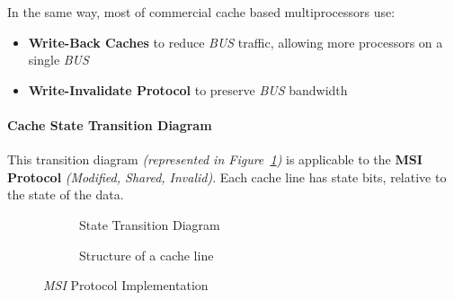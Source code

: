 \documentclass[english]{article}
\begin{document}
In the same way, most of commercial cache based multiprocessors use:

\begin{itemize}
  \item \textbf{Write-Back Caches} to reduce \textit{BUS} traffic, allowing more processors on a single \textit{BUS}
  \item \textbf{Write-Invalidate Protocol} to preserve \textit{BUS} bandwidth
\end{itemize}

\paragraph{Cache State Transition Diagram}

This transition diagram \textit{(represented in Figure~\ref{subfig:MSI-state-transition-diagram})} is applicable to the \textbf{MSI Protocol} \textit{(Modified, Shared, Invalid)}.
Each cache line has state bits, relative to the state of the data.

\begin{figure}[htbp]
  \bigskip
  \centering
  \begin{subfigure}[]{\textwidth}
    \centering

    \caption{State Transition Diagram}
    \label{subfig:MSI-state-transition-diagram}
    \bigskip
  \end{subfigure}
  \begin{subfigure}[]{\textwidth}
    \centering
    \caption{Structure of a cache line}
    \label{subfig:MSI-cache-line}
  \end{subfigure}
  \caption{\textit{MSI} Protocol Implementation}
  \label{fig:MSI-protocol}
\end{figure}
\end{document}
